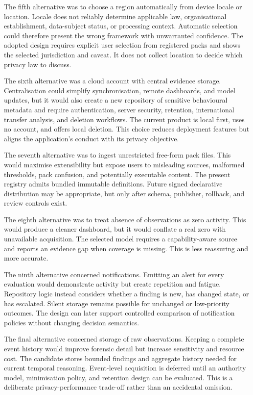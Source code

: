 The fifth alternative was to choose a region automatically from device locale or location. Locale does not reliably determine applicable law, organisational establishment, data-subject status, or processing context. Automatic selection could therefore present the wrong framework with unwarranted confidence. The adopted design requires explicit user selection from registered packs and shows the selected jurisdiction and caveat. It does not collect location to decide which privacy law to discuss.

The sixth alternative was a cloud account with central evidence storage. Centralisation could simplify synchronisation, remote dashboards, and model updates, but it would also create a new repository of sensitive behavioural metadata and require authentication, server security, retention, international transfer analysis, and deletion workflows. The current product is local first, uses no account, and offers local deletion. This choice reduces deployment features but aligns the application's conduct with its privacy objective.

The seventh alternative was to ingest unrestricted free-form pack files. This would maximise extensibility but expose users to misleading sources, malformed thresholds, pack confusion, and potentially executable content. The present registry admits bundled immutable definitions. Future signed declarative distribution may be appropriate, but only after schema, publisher, rollback, and review controls exist.

The eighth alternative was to treat absence of observations as zero activity. This would produce a cleaner dashboard, but it would conflate a real zero with unavailable acquisition. The selected model requires a capability-aware source and reports an evidence gap when coverage is missing. This is less reassuring and more accurate.

The ninth alternative concerned notifications. Emitting an alert for every evaluation would demonstrate activity but create repetition and fatigue. Repository logic instead considers whether a finding is new, has changed state, or has escalated. Silent storage remains possible for unchanged or low-priority outcomes. The design can later support controlled comparison of notification policies without changing decision semantics.

The final alternative concerned storage of raw observations. Keeping a complete event history would improve forensic detail but increase sensitivity and resource cost. The candidate stores bounded findings and aggregate history needed for current temporal reasoning. Event-level acquisition is deferred until an authority model, minimisation policy, and retention design can be evaluated. This is a deliberate privacy-performance trade-off rather than an accidental omission.

